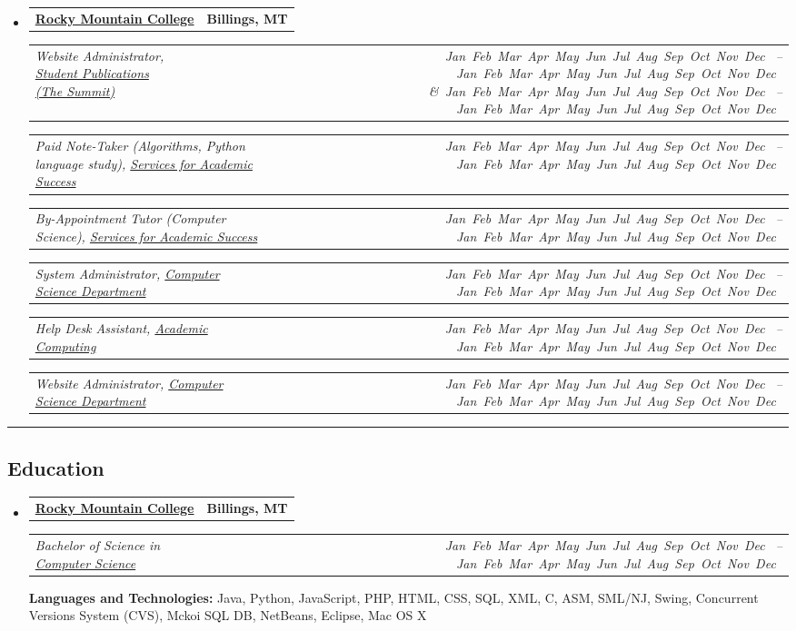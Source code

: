 \documentclass[9pt,letterpaper]{extarticle}
\makeatletter
\newcommand{\headerrow}[2]
{\begin{tabular*}{\linewidth}{l@{\extracolsep{\fill}}r}
	#1 &
	#2 \\
\end{tabular*}}
\newcommand{\DatestampYM}[2]{\mbox{\ShortMonth{#2}#1}}
\newcommand{\ShortMonth}[1]{
\ifcase#1\relax
\or Jan
\or Feb
\or Mar
\or Apr
\or May
\or Jun
\or Jul
\or Aug
\or Sep
\or Oct
\or Nov
\or Dec
\fi}
\makeatother
\begin{document}
\begin{itemize}
	\item
	\headerrow
		{\textbf{\href{http://www.rocky.edu}{Rocky Mountain College}}}
		{\textbf{Billings, MT}}
	\headerrow
		{\emph{Website Administrator, \href{http://summit.rocky.edu}{Student Publications (The Summit)}}}
		{\emph{\DatestampYM{2013}{01} --\DatestampYM{2013}{05} \&\DatestampYM{2014}{01} --\DatestampYM{2014}{05}}}
	\headerrow
		{\emph{Paid Note-Taker (Algorithms, Python language study), \href{https://www.rocky.edu/academics/academic-support/services-academic-success}{Services for Academic Success}}}
		{\emph{\DatestampYM{2013}{09} --\DatestampYM{2013}{12}}}
	\headerrow
		{\emph{By-Appointment Tutor (Computer Science), \href{https://www.rocky.edu/academics/academic-support/services-academic-success}{Services for Academic Success}}}
		{\emph{\DatestampYM{2012}{09} --\DatestampYM{2014}{05}}}
	\headerrow
		{\emph{System Administrator, \href{http://cs.rocky.edu}{Computer Science Department}}}
		{\emph{\DatestampYM{2012}{03} --\DatestampYM{2014}{05}}}
	\headerrow
		{\emph{Help Desk Assistant, \href{https://www.rocky.edu/resources/offices-departments/academic-computing}{Academic Computing}}}
		{\emph{\DatestampYM{2011}{09} --\DatestampYM{2013}{05}}}
	\headerrow
		{\emph{Website Administrator, \href{http://cs.rocky.edu/programming-competitions/high-school-competions/}{Computer Science Department}}}
		{\emph{\DatestampYM{2010}{09} --\DatestampYM{2011}{05}}}
\end{itemize}


\hrule
\vspace{-0.5em}
\subsection*{Education}

\begin{itemize}
	\parskip=0.1em

	\item
	\headerrow
		{\textbf{\href{http://www.rocky.edu/}{Rocky Mountain College}}}
		{\textbf{Billings, MT}}
	\headerrow
		{\emph{Bachelor of Science in \href{http://cs.rocky.edu/}{Computer Science}}}
		{\emph{\DatestampYM{2010}{08} --\DatestampYM{2014}{05}}}
	\textbf{Languages and Technologies:} Java, Python, JavaScript, PHP, HTML, CSS, SQL, XML, C, ASM, SML/NJ, Swing, Concurrent Versions System (CVS), Mckoi SQL DB, NetBeans, Eclipse, Mac OS X	
\end{itemize}
\end{document}
